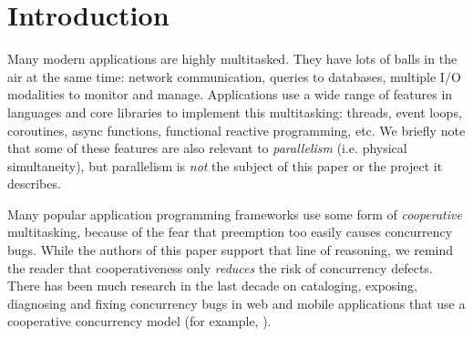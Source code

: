 \documentclass[acmsmall,anonymous,review]{acmart}\settopmatter{printfolios=true,printccs=false,printacmref=false}
\begin{document}

\maketitle




\section{Introduction}


Many modern applications are highly multitasked.
They have lots of balls in the air at the same time: network communication, queries to databases, multiple I/O modalities to monitor and manage.
Applications use a wide range of features in languages and core libraries to implement this multitasking: threads, event loops, coroutines, async functions, functional reactive programming, etc.
We briefly note that some of these features are also relevant to \emph{parallelism} (i.e. physical simultaneity), but parallelism is \emph{not} the subject of this paper or the project it describes.

Many popular application programming frameworks use some form of \emph{cooperative} multitasking, because of the fear that preemption too easily causes concurrency bugs.
While the authors of this paper support that line of reasoning, we remind the reader that cooperativeness only \emph{reduces} the risk of concurrency defects\footnotemark{}.
There has been much research in the last decade on cataloging, exposing, diagnosing and fixing concurrency bugs in web and mobile applications that use a cooperative concurrency model (for example, \cite{Hsiao2014, Petrov2012, Mutlu2015}).
\end{document}
